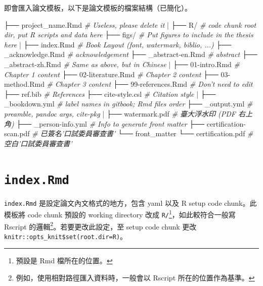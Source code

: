\documentclass[oneside]{book}
\newenvironment{Shaded}{\begin{snugshade}}{\end{snugshade}}
\newcommand{\CommentTok}[1]{\textcolor[rgb]{0.56,0.35,0.01}{\textit{#1}}}
\newcommand{\NormalTok}[1]{#1}
\newcommand{\StringTok}[1]{\textcolor[rgb]{0.31,0.60,0.02}{#1}}
\begin{document}
即會匯入論文模板，以下是論文模板的檔案結構（已簡化）。

\begin{Shaded}
\begin{Highlighting}[]
\NormalTok{├── project_name.Rmd     }\CommentTok{# Useless, please delete it}
\StringTok{|}
\NormalTok{├── R/                   }\CommentTok{# code chunk root dir, put R scripts and data here}
\NormalTok{├── figs/                }\CommentTok{# Put figures to include in the thesis here}
\StringTok{|}
\NormalTok{├── index.Rmd            }\CommentTok{# Book Layout (font, watermark, biblio, ...)}
\NormalTok{├── _acknowledge.Rmd     }\CommentTok{# acknowledgement}
\NormalTok{├── _abstract-en.Rmd     }\CommentTok{# abstract}
\NormalTok{├── _abstract-zh.Rmd     }\CommentTok{# Same as above, but in Chinese}
\StringTok{|}
\NormalTok{├── 01-intro.Rmd         }\CommentTok{# Chapter 1 content}
\NormalTok{├── 02-literature.Rmd    }\CommentTok{# Chapter 2 content}
\NormalTok{├── 03-method.Rmd        }\CommentTok{# Chapter 3 content}
\NormalTok{├── 99-references.Rmd    }\CommentTok{# Don't need to edit}
\NormalTok{├── ref.bib              }\CommentTok{# References}
\NormalTok{├── cite-style.csl       }\CommentTok{# Citation style}
\StringTok{|}
\NormalTok{├── _bookdown.yml        }\CommentTok{# label names in gitbook; Rmd files order}
\NormalTok{├── _output.yml          }\CommentTok{# preamble, pandoc args, cite-pkg}
\StringTok{|}
\NormalTok{├── watermark.pdf        }\CommentTok{# 臺大浮水印 (PDF 右上角)}
\NormalTok{├── _person-info.yml      }\CommentTok{# Info to generate front matter}
\NormalTok{├── certification-scan.pdf  }\CommentTok{# 已簽名'口試委員審查書'}
\NormalTok{└── front_matter}
\NormalTok{    └── certification.pdf   }\CommentTok{# 空白'口試委員審查書'}
\end{Highlighting}
\end{Shaded}

\hypertarget{index-rmd}{%
\section{\texorpdfstring{\texttt{index.Rmd}}{index.Rmd}}\label{index-rmd}}

\texttt{index.Rmd} 是設定論文內文格式的地方，包含 yaml 以及 R setup code chunk。此模板將 code chunk 預設的 working directory 改成 \texttt{R/}\footnote{預設是 Rmd 檔所在的位置。}，如此較符合一般寫 Rscript 的邏輯\footnote{例如，使用相對路徑匯入資料時，一般會以 Rscript 所在的位置作為基準。}。若要更改此設定，至 setup code chunk 更改 \texttt{knitr::opts\_knit\$set(root.dir=\textquotesingle{}R\textquotesingle{})}。
\end{document}
